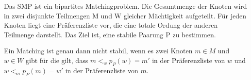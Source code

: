 Das SMP ist ein bipartites Matchingproblem. Die Gesamtmenge der Knoten wird in zwei disjunkte Teilmengen M und W gleicher Mächtigkeit aufgeteilt. Für jeden Knoten liegt eine Präferenzliste vor, die eine totale Ordung der anderen Teilmenge darstellt. Das Ziel ist, eine stabile Paarung P zu bestimmen.

\begin{Definition}
\label{stabil}
  Ein Matching ist genau dann nicht stabil, wenn es zwei Knoten $m \in M$ und $w \in W$ gibt für die gilt, dass $m <_{w} p_{P}(w) = m'$ in der Präferenzliste von $w$ und $w <_{m} p_{P}(m) = w'$ in der Präferenzliste von $m$.
\end{Definition}
